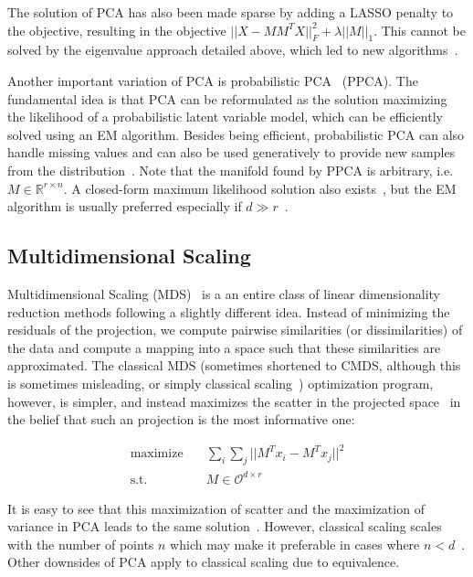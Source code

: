 The solution of PCA has also been made sparse by adding a LASSO penalty to the
objective, resulting in the objective $|| X - MM^T X ||_F^2 + \lambda || M ||_1$.
This cannot be solved by the eigenvalue approach detailed above, which led to
new algorithms~\cite{linearsurvey}. %

Another important variation of PCA is probabilistic PCA~\cite{probabilistic_pca} (PPCA). The fundamental
idea is that PCA can be reformulated as the solution maximizing the likelihood of a probabilistic
latent variable model, which can be efficiently solved using an EM algorithm. Besides being efficient,
probabilistic PCA can also handle missing values and can also be used generatively to provide
new samples from the distribution~\cite{bishop}. Note that the manifold found by PPCA is arbitrary,
i.e. $M \in \mathbb{R}^{r \times n}$. A closed-form maximum likelihood solution also exists~\cite{probabilistic_pca},
but the EM algorithm is usually preferred especially if $d \gg r$~\cite{linearsurvey}.

\subsection{Multidimensional Scaling}

Multidimensional Scaling (MDS)~\cite{torgerson} is a an entire class of linear
dimensionality reduction methods following a slightly different idea. Instead
of minimizing the residuals of the projection, we compute pairwise similarities
(or dissimilarities) of the data and compute a mapping into a space such that
these similarities are approximated. The classical MDS (sometimes shortened to
CMDS, although this is sometimes misleading, or simply classical scaling~\cite{vandermaaten_review}) optimization program, however, is
simpler, and instead maximizes the scatter in the projected space~\cite{linearsurvey} in the belief
that such an projection is the most informative one:

\begin{align}
    \text{maximize} \quad & \sum_i \sum_j ||M^T x_i - M^T x_j||^2\\
    \text{s.t.} \quad & M \in \mathcal{O}^{d \times r} \nonumber
\end{align}

It is easy to see that this maximization of scatter and the maximization of
variance in PCA leads to the same solution~\cite{cox_mds, borg_groenen_mds}.
However, classical scaling scales with the number of points $n$ which may make
it preferable in cases where $n < d$~\cite{vandermaaten_review}. Other
downsides of PCA apply to classical scaling due to equivalence.

